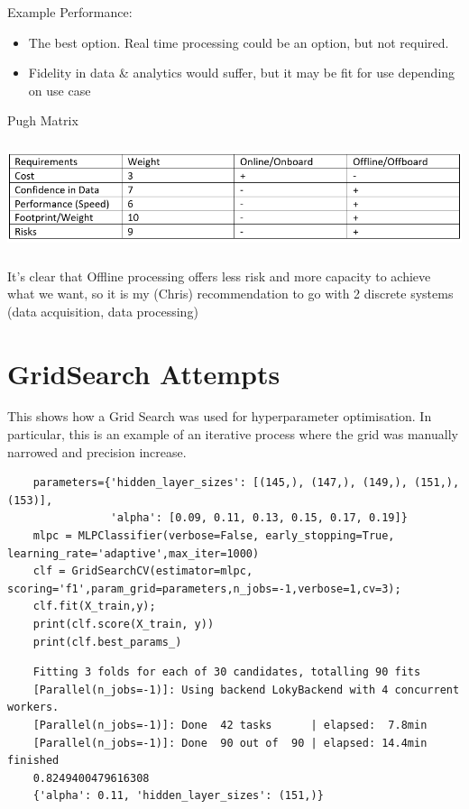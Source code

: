 \documentclass{UoNMCHA}
\numberwithin{equation}{section}
\begin{document}
{Example Performance:}

\begin{itemize}
\item
  The best option. Real time processing could be an option, but not
  required.
\item
  Fidelity in data \& analytics would suffer, but it may be fit for use
  depending on use case
\end{itemize}

Pugh Matrix

\includegraphics[width=6.21513in,height=1.25in]{Figures/pugh.png}

It's clear that Offline processing offers less risk and more capacity to
achieve what we want, so it is my (Chris) recommendation to go with 2
discrete systems (data acquisition, data processing)

\clearpage \section{GridSearch Attempts}\label{apx:GSAttempt}
This shows how a Grid Search was used for hyperparameter optimisation. In particular, this is an example of an iterative process where the grid was manually narrowed and precision increase. 
\begin{lstlisting}
    parameters={'hidden_layer_sizes': [(145,), (147,), (149,), (151,), (153)],
                'alpha': [0.09, 0.11, 0.13, 0.15, 0.17, 0.19]}
    mlpc = MLPClassifier(verbose=False, early_stopping=True, learning_rate='adaptive',max_iter=1000)
    clf = GridSearchCV(estimator=mlpc, scoring='f1',param_grid=parameters,n_jobs=-1,verbose=1,cv=3);
    clf.fit(X_train,y);
    print(clf.score(X_train, y))
    print(clf.best_params_)
\end{lstlisting}
\begin{lstlisting}
    Fitting 3 folds for each of 30 candidates, totalling 90 fits
    [Parallel(n_jobs=-1)]: Using backend LokyBackend with 4 concurrent workers.
    [Parallel(n_jobs=-1)]: Done  42 tasks      | elapsed:  7.8min
    [Parallel(n_jobs=-1)]: Done  90 out of  90 | elapsed: 14.4min finished
    0.8249400479616308
    {'alpha': 0.11, 'hidden_layer_sizes': (151,)}
\end{lstlisting}
\end{document}
